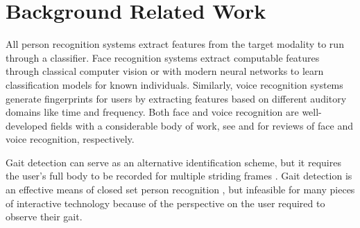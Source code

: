 \documentclass[conference]{IEEEtran}
\begin{document}










\section{Background Related Work}


All person recognition systems extract features from the target modality to run through a classifier. Face recognition systems extract computable features through classical computer vision \cite{turk1991face} or with modern neural networks \cite{parkhi2015deep} to learn classification models for known individuals. Similarly, voice recognition systems generate fingerprints for users by extracting features based on different auditory domains like time and frequency\cite{alonso2014speaker}. Both face and voice recognition are well-developed fields with a considerable body of work, see 
\cite{tolba2006face} and \cite{beigi2011speaker} for reviews of face and voice recognition, respectively.

Gait detection can serve as an alternative identification scheme, but it requires the user's full body to be recorded for multiple striding frames \cite{liang_wang_silhouette_2003}\cite{han_individual_2006}. Gait detection is an effective means of closed set person recognition \cite{tian2019free}, but infeasible for many pieces of interactive technology because of the perspective on the user required to observe their gait.
\end{document}
